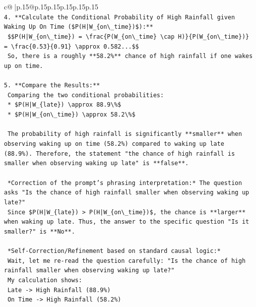 \documentclass{article}
\begin{document}
{\begin{supertabular}{c@{$\;$}|p{.15\linewidth}@{}p{.15\linewidth}p{.15\linewidth}p{.15\linewidth}p{.15\linewidth}p{.15\linewidth}}
{{{\\ 
\texttt{4.  **Calculate the Conditional Probability of High Rainfall given Waking Up On Time (\$P(H|W\_\{on\textbackslash{}\_time\})\$):**} \\
\texttt{    \$\$P(H|W\_\{on\textbackslash{}\_time\}) = \textbackslash{}frac\{P(W\_\{on\textbackslash{}\_time\} \textbackslash{}cap H)\}\{P(W\_\{on\textbackslash{}\_time\})\} = \textbackslash{}frac\{0.53\}\{0.91\} \textbackslash{}approx 0.582...\$\$} \\
\texttt{    So, there is a roughly **58.2\%** chance of high rainfall if one wakes up on time.} \\
\\ 
\texttt{5.  **Compare the Results:**} \\
\texttt{    Comparing the two conditional probabilities:} \\
\texttt{    *   \$P(H|W\_\{late\}) \textbackslash{}approx 88.9\textbackslash{}\%\$} \\
\texttt{    *   \$P(H|W\_\{on\textbackslash{}\_time\}) \textbackslash{}approx 58.2\textbackslash{}\%\$} \\
\\ 
\texttt{    The probability of high rainfall is significantly **smaller** when observing waking up on time (58.2\%) compared to waking up late (88.9\%). Therefore, the statement "the chance of high rainfall is smaller when observing waking up late" is **false**.} \\
\\ 
\texttt{    *Correction of the prompt's phrasing interpretation:* The question asks "Is the chance of high rainfall smaller when observing waking up late?"} \\
\texttt{    Since \$P(H|W\_\{late\}) > P(H|W\_\{on\textbackslash{}\_time\})\$, the chance is **larger** when waking up late. Thus, the answer to the specific question "Is it smaller?" is **No**.} \\
\\ 
\texttt{    *Self{-}Correction/Refinement based on standard causal logic:*} \\
\texttt{    Wait, let me re{-}read the question carefully: "Is the chance of high rainfall smaller when observing waking up late?"} \\
\texttt{    My calculation shows:} \\
\texttt{    Late {-}> High Rainfall (88.9\%)} \\
\texttt{    On Time {-}> High Rainfall (58.2\%)} \\
\\ 
}}}
\end{supertabular}}
\end{document}
